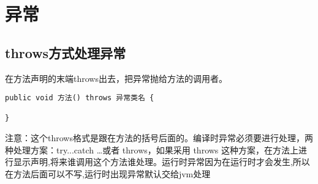 \section*{异常}


\subsection*{throws方式处理异常}
在方法声明的末端throws出去，把异常抛给方法的调用者。
\begin{lstlisting}[style=Java]
public void 方法() throws 异常类名 {

}
\end{lstlisting}



注意：这个throws格式是跟在方法的括号后面的。编译时异常必须要进行处理，两种处理方案：try...catch …或者 throws，如果采用 throws 这种方案，在方法上进行显示声明,将来谁调用这个方法谁处理。运行时异常因为在运行时才会发生,所以在方法后面可以不写,运行时出现异常默认交给jvm处理


